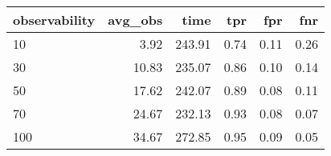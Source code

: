 \begin{tabular}{lrrrrr}
\toprule
observability &  avg\_obs &   time &  tpr &  fpr &  fnr \\
\midrule
           10 &     3.92 & 243.91 & 0.74 & 0.11 & 0.26 \\
           30 &    10.83 & 235.07 & 0.86 & 0.10 & 0.14 \\
           50 &    17.62 & 242.07 & 0.89 & 0.08 & 0.11 \\
           70 &    24.67 & 232.13 & 0.93 & 0.08 & 0.07 \\
          100 &    34.67 & 272.85 & 0.95 & 0.09 & 0.05 \\
\bottomrule
\end{tabular}
